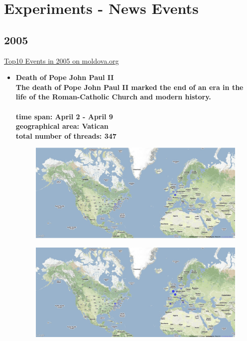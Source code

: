 \documentclass[11pt,a4paper,english]{article}
\begin{document}
 \newpage

	\section{Experiments - News Events}
			\subsection{2005}
			\href{http://politicom.moldova.org/news/10-most-important-world-events-of-2005-7712-eng.html}{Top10 Events in 2005 on moldova.org}
				\begin{itemize}
				\item \bf Death of Pope John Paul II\rm
					\\ The death of Pope John Paul II marked the end of an era in the life of the Roman-Catholic Church and modern history. 
					\\\\ \bf time span: \rm April 2 - April 9
					\\ \bf geographical area: \rm Vatican
					\\ \bf total number of threads: \rm 347

					\begin{figure}[H]
						\vspace{-5pt}	
						\begin{center}
							\includegraphics[width=130mm]{img/pre-pope}
						\end{center}
						\vspace{-13pt}
					\end{figure}
					\begin{figure}[H]
						\vspace{-10pt}
  						\begin{center}
							\includegraphics[width=130mm]{img/post-pope}
						\end{center}
						\vspace{-5pt}
					\end{figure}
						

\end{itemize}
\end{document}
